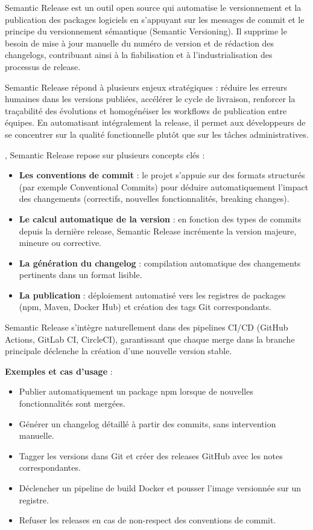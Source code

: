 Semantic Release est un outil open source qui automatise le versionnement et la publication des packages logiciels en s’appuyant sur les messages de commit et le principe du versionnement sémantique (Semantic Versioning). Il supprime le besoin de mise à jour manuelle du numéro de version et de rédaction des changelogs, contribuant ainsi à la fiabilisation et à l’industrialisation des processus de release.

 Semantic Release répond à plusieurs enjeux stratégiques  : réduire les erreurs humaines dans les versions publiées, accélérer le cycle de livraison, renforcer la traçabilité des évolutions et homogénéiser les workflows de publication entre équipes. En automatisant intégralement la release, il permet aux développeurs de se concentrer sur la qualité fonctionnelle plutôt que sur les tâches administratives.

, Semantic Release repose sur plusieurs concepts clés  :
\begin{itemize}
	\item \textbf{Les conventions de commit}  : le projet s’appuie sur des formats structurés (par exemple Conventional Commits) pour déduire automatiquement l’impact des changements (correctifs, nouvelles fonctionnalités, breaking changes).
	\item \textbf{Le calcul automatique de la version}  : en fonction des types de commits depuis la dernière release, Semantic Release incrémente la version majeure, mineure ou corrective.
	\item \textbf{La génération du changelog}  : compilation automatique des changements pertinents dans un format lisible.
	\item \textbf{La publication}  : déploiement automatisé vers les registres de packages (npm, Maven, Docker Hub) et création des tags Git correspondants.
\end{itemize}

Semantic Release s’intègre naturellement dans des pipelines CI/CD (GitHub Actions, GitLab CI, CircleCI), garantissant que chaque merge dans la branche principale déclenche la création d’une nouvelle version stable.

\textbf{Exemples et cas d’usage} :
\begin{itemize}
	\item Publier automatiquement un package npm lorsque de nouvelles fonctionnalités sont mergées.
	\item Générer un changelog détaillé à partir des commits, sans intervention manuelle.
	\item Tagger les versions dans Git et créer des releases GitHub avec les notes correspondantes.
	\item Déclencher un pipeline de build Docker et pousser l’image versionnée sur un registre.
	\item Refuser les releases en cas de non-respect des conventions de commit.
\end{itemize}

